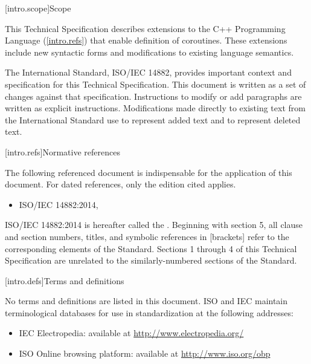 
[intro.scope]{Scope}

\pnum
This Technical Specification describes extensions to the C++ 
Programming Language (\ref{intro.refs}) that
enable definition of coroutines. These extensions include 
new syntactic forms and modifications to existing language semantics.

\pnum
The International Standard, ISO/IEC 14882, provides important context
and specification for this Technical Specification. This document is 
written as a set of changes against that specification. Instructions
to modify or add paragraphs are written as explicit instructions. 
Modifications made directly to existing text from the International
Standard use  to represent added text and
 to represent deleted text. 

[intro.refs]{Normative references}

\pnum
The following referenced document is indispensable for the
application of this document. For dated references, only the
edition cited applies. 

\begin{itemize}
	\item ISO/IEC 14882:2014, 
\end{itemize}

ISO/IEC 14882:2014 is hereafter called the .
%
Beginning with section 5, all clause and section numbers, titles,
and symbolic references in [brackets] refer to the corresponding elements of the \Cpp Standard. Sections 1 through 4 of this Technical
Specification 
are unrelated to the similarly-numbered sections of the \Cpp Standard.


[intro.defs]{Terms and definitions}

No terms and definitions are listed in this document.
ISO and IEC maintain terminological databases for use in standardization at the following addresses:

\begin{itemize}
	\item IEC Electropedia: available at \url{http://www.electropedia.org/}
	\item ISO Online browsing platform: available at \url{http://www.iso.org/obp}
\end{itemize}


